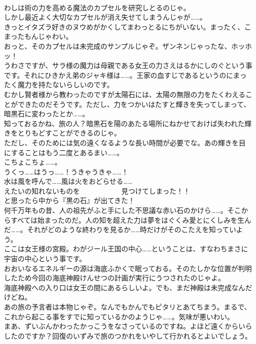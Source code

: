 \documentclass[8pt]{extreport}
\begin{document}
\begin{CJK}{UTF8}{min}
\\	わしは術の力を高める魔法のカプセルを研究しとるのじゃ。	
\\	しかし最近よく大切なカプセルが消え失せてしまうんじゃが……。	
\\	きっとイタズラ好きのヌウめがかくしてまわっとるにちがいない。まったく、こまったもんじゃわい。	
\\	おっと、そのカプセルは未完成のサンプルじゃぞ。ザンネンじゃったな、ホッホッ！	
\\	うわさですが、サラ様の魔力は母親である女王の力さえはるかにしのぐという事です。それにひきかえ弟のジャキ様は……。王家の血すじであるというのにまったく魔力を持たないらしいのです。	
\\	むかし賢者様から教わったのですが太陽石には、太陽の無限の力をたくわえることができたのだそうです。ただし、力をつかいはたすと輝きを失ってしまって、暗黒石に変わったとか……。	
\\	知っておるかね、旅の人？暗黒石を陽のあたる場所にねかせておけば失われた輝きをとりもどすことができるのじゃ。	
\\	ただし、そのためには気の遠くなるような長い時間が必要でな。あの輝きを目にすることはもう二度とあるまい……。	
\\	こちょこちょ……。	
\\	うくっ……はうっ……！うきゃうきゃ……！	
\\	水は風を呼んで……風は火をおどらせる……	
\\	えたいの知れないものを　　　　　　見つけてしまった！！	
\\	と思ったら中から『黒の石』が出てきた！	
\\	何千万年もの昔、人の祖先がふと手にした不思議な赤い石のかけら……。そこからすべては始まったのだ。人の知を超えた力は夢をはぐくみ愛とにくしみを生んだ……。それがどのような終わりを見るか……時だけがそのこたえを知っていよう。	
\\	ここは女王様の宮殿。わがジール王国の中心……ということは、すなわちまさに宇宙の中心という事です。	
\\	おおいなるエネルギーの源は海底ふかくで眠っておる。そのたしかな位置が判明したため今回の海底神殿けんせつの計画が実行にうつされたのじゃよ。	
\\	海底神殿への入り口は女王の間にあるらしいよ。でも、まだ神殿は未完成なんだけどね。	
\\	あの旅の予言者は本物じゃぞ。なんでもかんでもピタリとあてちまう。まるで、これから起こる事をすでに知っているかのようじゃ……。気味が悪いわい。	
\\	まあ、ずいぶんかわったかっこうをなさっているのですね。よほど遠くからいらしたのですか？回復のいずみで旅のつかれをいやして行かれるとよいでしょう。	

\end{CJK}
\end{document}
